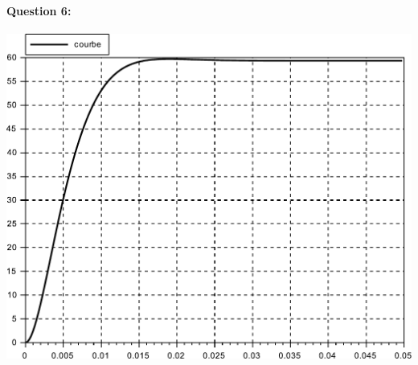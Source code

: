 \paragraph{Question 6:} 

\begin{center}
 \includegraphics[width=0.8\linewidth]{img/Figure_moteur_charge}
\end{center}

